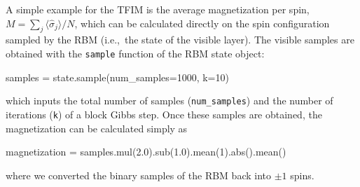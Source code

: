 \documentclass[submission, Phys, hidelnks]{SciPost}
\begin{document}
A simple example for the TFIM is the average magnetization per spin, $M=\sum_j\langle\hat{\sigma}_j\rangle/N$, which can be calculated directly on the spin configuration sampled by the RBM (i.e.,~the state of the visible layer). The visible samples are obtained with the \verb|sample| function of the RBM state object:
\begin{python}
samples = state.sample(num_samples=1000, k=10)
\end{python}
which inputs the total number of samples (\verb|num_samples|) and the number of iterations (\verb|k|) of a block Gibbs step. Once these samples are obtained, the magnetization can be calculated simply as
\begin{python}
magnetization = samples.mul(2.0).sub(1.0).mean(1).abs().mean()
\end{python}
where we converted the binary samples of the RBM back into $\pm 1$ spins.
\end{document}
